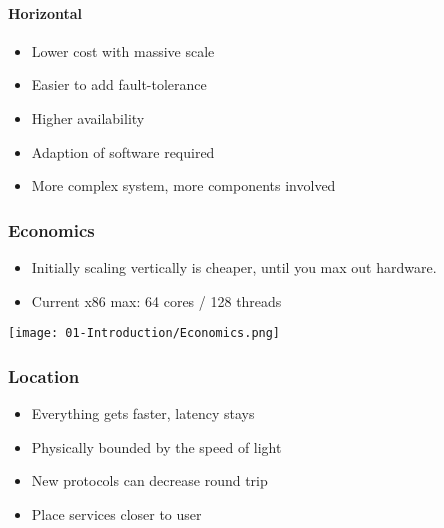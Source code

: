 \paragraph{Horizontal}
\begin{itemize}[label={\textcolor{ForestGreen}{+}}]
    \item Lower cost with massive scale
    \item Easier to add fault-tolerance
    \item Higher availability
\end{itemize}
\begin{itemize}[label={\textcolor{red}{--}}]
    \item Adaption of software required
    \item More complex system, more components involved
\end{itemize}

\subsubsection{Economics}
\begin{minipage}{0.6\linewidth}
    \begin{itemize}
        \item Initially scaling vertically is cheaper, until you max out hardware.
        \item Current x86 max: 64 cores / 128 threads
    \end{itemize}
\end{minipage}
\begin{minipage}{0.45\linewidth}
\begin{center}
    \texttt{[image: 01-Introduction/Economics.png]}    
\end{center}
\end{minipage}


\subsubsection{Location}
\begin{itemize}
    \item Everything gets faster, latency stays
    \item Physically bounded by the speed of light
    \item New protocols can decrease round trip
    \item Place services closer to user
\end{itemize}

